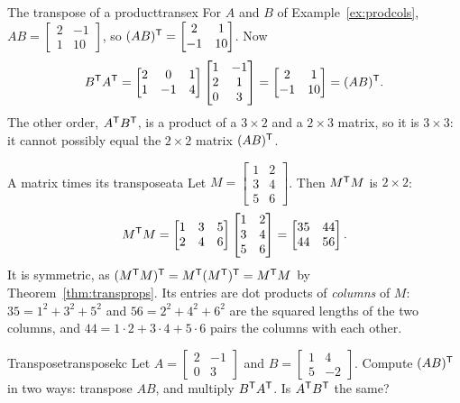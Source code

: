 \documentclass[11pt]{article}
\begin{document}
\begin{exmp}{The transpose of a product}{transex}
For $A$ and $B$ of Example~\ref{ex:prodcols}, $AB=\begin{bmatrix}2&-1\\1&10\end{bmatrix}$, so $(AB)^{\mathsf T}=\begin{bmatrix}2&1\\-1&10\end{bmatrix}$. Now
\[
B^{\mathsf T} A^{\mathsf T}=\begin{bmatrix}2&0&1\\1&-1&4\end{bmatrix}\begin{bmatrix}1&-1\\2&1\\0&3\end{bmatrix}=\begin{bmatrix}2&1\\-1&10\end{bmatrix}=(AB)^{\mathsf T}.
\]
The other order, $A^{\mathsf T} B^{\mathsf T}$, is a product of a $3\times2$ and a $2\times3$ matrix, so it is $3\times3$: it cannot possibly equal the $2\times2$ matrix $(AB)^{\mathsf T}$.
\end{exmp}

\begin{exmp}{A matrix times its transpose}{ata}
Let $M=\begin{bmatrix}1&2\\3&4\\5&6\end{bmatrix}$. Then $M^{\mathsf T} M$ is $2\times2$:
\[
M^{\mathsf T} M=\begin{bmatrix}1&3&5\\2&4&6\end{bmatrix}\begin{bmatrix}1&2\\3&4\\5&6\end{bmatrix}=\begin{bmatrix}35&44\\44&56\end{bmatrix}.
\]
It is symmetric, as $(M^{\mathsf T} M)^{\mathsf T}=M^{\mathsf T}(M^{\mathsf T})^{\mathsf T}=M^{\mathsf T} M$ by Theorem~\ref{thm:transprops}. Its entries are dot products of \emph{columns} of $M$: $35=1^2+3^2+5^2$ and $56=2^2+4^2+6^2$ are the squared lengths of the two columns, and $44=1\cdot2+3\cdot4+5\cdot6$ pairs the columns with each other.
\end{exmp}

\begin{kc}{Transpose}{transposekc}
Let $A=\begin{bmatrix}2&-1\\0&3\end{bmatrix}$ and $B=\begin{bmatrix}1&4\\5&-2\end{bmatrix}$. Compute $(AB)^{\mathsf T}$ in two ways: transpose $AB$, and multiply $B^{\mathsf T} A^{\mathsf T}$. Is $A^{\mathsf T} B^{\mathsf T}$ the same?
\end{kc}
\end{document}
